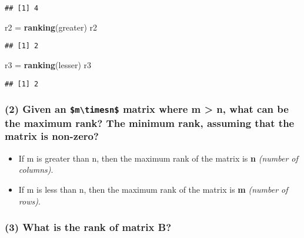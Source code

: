 \documentclass[]{article}
\newenvironment{Shaded}{\begin{snugshade}}{\end{snugshade}}
\newcommand{\KeywordTok}[1]{\textcolor[rgb]{0.13,0.29,0.53}{\textbf{#1}}}
\newcommand{\NormalTok}[1]{#1}
\newcommand{\StringTok}[1]{\textcolor[rgb]{0.31,0.60,0.02}{#1}}
\begin{document}
\begin{verbatim}
## [1] 4
\end{verbatim}

\begin{Shaded}
\begin{Highlighting}[]
\NormalTok{r2 =}\StringTok{ }\KeywordTok{ranking}\NormalTok{(greater)}
\NormalTok{r2}
\end{Highlighting}
\end{Shaded}

\begin{verbatim}
## [1] 2
\end{verbatim}

\begin{Shaded}
\begin{Highlighting}[]
\NormalTok{r3 =}\StringTok{ }\KeywordTok{ranking}\NormalTok{(lesser)}
\NormalTok{r3}
\end{Highlighting}
\end{Shaded}

\begin{verbatim}
## [1] 2
\end{verbatim}

\hypertarget{given-an-mtimesn-matrix-where-m-n-what-can-be-the-maximum-rank-the-minimum-rank-assuming-that-the-matrix-is-non-zero}{%
\subsubsection{\texorpdfstring{(2) Given an
\texttt{\$m\textbackslash{}timesn\$} matrix where m \textgreater{} n,
what can be the maximum rank? The minimum rank, assuming that the matrix
is
non-zero?}{(2) Given an \$m\textbackslash timesn\$ matrix where m \textgreater{} n, what can be the maximum rank? The minimum rank, assuming that the matrix is non-zero?}}\label{given-an-mtimesn-matrix-where-m-n-what-can-be-the-maximum-rank-the-minimum-rank-assuming-that-the-matrix-is-non-zero}}

\begin{itemize}
\item
  If m is greater than n, then the maximum rank of the matrix is
  \textbf{n} \emph{(number of columns)}.
\item
  If m is less than n, then the maximum rank of the matrix is \textbf{m}
  \emph{(number of rows)}.
\end{itemize}

\hypertarget{what-is-the-rank-of-matrix-b}{%
\subsubsection{(3) What is the rank of matrix
B?}\label{what-is-the-rank-of-matrix-b}}
\end{document}

